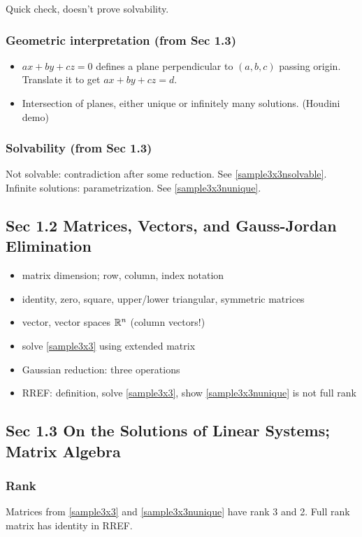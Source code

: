 \documentclass[12pt,a4paper]{article}
\def\R{\ifmmode\mathbb R\fi}
\begin{document}
\bigskip

Quick check, doesn't prove  solvability.


\subsubsection*{Geometric interpretation (from Sec 1.3)}

\begin{itemize}
	\item $ax+by+cz = 0$ defines a plane perpendicular to $(a, b, c)$ passing origin. Translate it to get $ax+by+cz = d$. 
	\item Intersection of planes, either unique or infinitely many solutions. (Houdini demo)
\end{itemize}

\subsubsection*{Solvability (from Sec 1.3)} 
Not solvable: contradiction after some reduction. See \eqref{sample3x3nsolvable}.\\
Infinite solutions: parametrization. See \eqref{sample3x3nunique}.

\subsection*{Sec 1.2 Matrices, Vectors, and Gauss-Jordan Elimination}
\begin{itemize}
	\item matrix dimension; row, column, index notation
	\item identity, zero, square, upper/lower triangular, symmetric matrices
	\item vector, vector spaces $\R^n$ (column vectors!)
	\item solve \eqref{sample3x3} using extended matrix
	\item Gaussian reduction: three operations
	\item RREF: definition, solve \eqref{sample3x3}, show \eqref{sample3x3nunique} is not full rank
\end{itemize}

\subsection*{Sec 1.3 On the Solutions of Linear Systems; Matrix Algebra}

\subsubsection*{Rank}
Matrices from \eqref{sample3x3} and \eqref{sample3x3nunique} have rank 3 and 2. Full rank matrix has identity in RREF.
\end{document}
